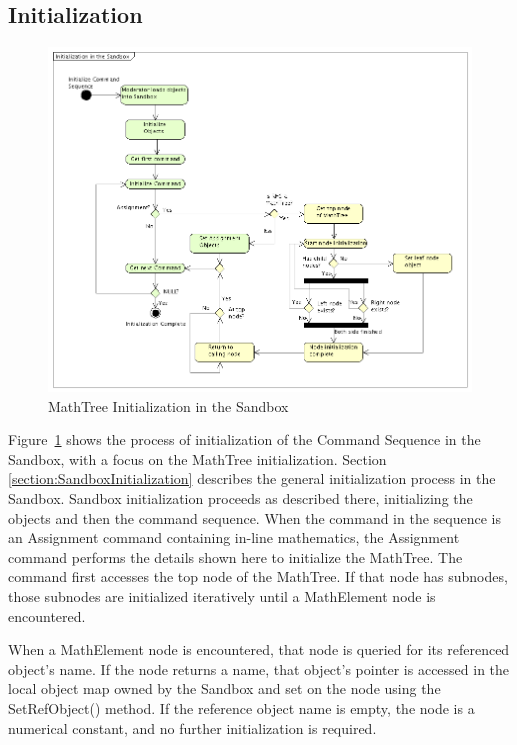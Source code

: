 \subsection{Initialization}

\begin{figure}
\begin{center}
\includegraphics[430,350]{Images/MathTreeInitialization.png}
\caption{\label{figure:MathInitialization}MathTree Initialization in the
Sandbox}
\end{center}
\end{figure}

Figure~\ref{figure:MathInitialization} shows the process of initialization of
the Command Sequence in the Sandbox, with a focus on the MathTree
initialization.  Section \ref{section:SandboxInitialization} describes the
general initialization process in the Sandbox.  Sandbox initialization proceeds
as described there, initializing the objects and then the command sequence.
When the command in the sequence is an Assignment command containing in-line
mathematics, the Assignment command performs the details shown here to
initialize the MathTree.  The command first accesses the top node of the
MathTree.  If that node has subnodes, those subnodes are initialized
iteratively until a MathElement node is encountered.

When a MathElement node is encountered, that node is queried for its referenced
object's name.  If the node returns a name, that object's pointer is accessed
in the local object map owned by the Sandbox and set on the node using the
SetRefObject() method.  If the reference object name is empty, the node is a
numerical constant, and no further initialization is required.

